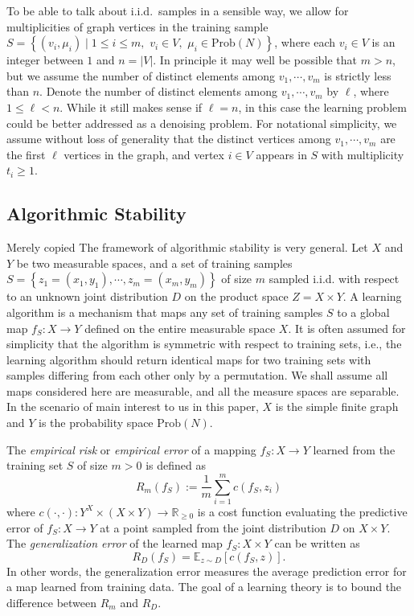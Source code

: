 \documentclass[letterpaper]{article} %
\begin{document}
To be able to talk about i.i.d.\ samples in a sensible way, we allow for multiplicities of graph vertices in the training sample $S=\left\{ \left( v_i,\mu_i \right)\mid 1\leq i\leq m,\,\,v_i\in V,\,\,\mu_i\in\mathrm{Prob}\left( N \right) \right\}$, where each $v_i\in V$ is an integer between $1$ and $n=\left| V \right|$. In principle it may well be possible that $m>n$, but we assume the number of distinct elements among $v_1,\cdots,v_m$ is strictly less than $n$. Denote the number of distinct elements among $v_1,\cdots,v_m$ by $\ell$, where $1\leq \ell<n$. While it still makes sense if $\ell=n$, in this case the learning problem could be better addressed as a denoising problem. For notational simplicity, we assume without loss of generality that the distinct vertices among $v_1,\cdots,v_m$ are the first $\ell$ vertices in the graph, and vertex $i\in V$ appears in $S$ with multiplicity $t_i\geq 1$.


\subsection{Algorithmic Stability}  {\color{red}Merely copied}
The framework of algorithmic stability \cite{DW1979,Algorithmic_Stability} is very general. Let $X$ and $Y$ be two measurable spaces, and a set of training samples $S=\left\{ z_1=\left( x_1,y_1 \right),\cdots,z_m= \left( x_m, y_m \right) \right\}$ of size $m$ sampled i.i.d. with respect to an unknown joint distribution $D$ on the product space $Z=X\times Y$. A learning algorithm is a mechanism that maps any set of training samples $S$ to a global map $f_S:X\rightarrow Y$ defined on the entire measurable space $X$. It is often assumed for simplicity that the algorithm is symmetric with respect to training sets, i.e., the learning algorithm should return identical maps for two training sets with samples differing from each other only by a permutation. We shall assume all maps considered here are measurable, and all the measure spaces are separable. In the scenario of main interest to us in this paper, $X$ is the simple finite graph and $Y$ is the probability space $\mathrm{Prob}\left( N \right)$.

The \emph{empirical risk} or \emph{empirical error} of a mapping $f_S:X\rightarrow Y$ learned from the training set $S$ of size $m>0$ is defined as
\begin{equation*}
  R_m \left( f_S \right):=\frac{1}{m}\sum_{i=1}^mc \left( f_S, z_i \right)
\end{equation*}
where $c \left( \cdot,\cdot \right):Y^X\times \left( X\times Y \right)\rightarrow\mathbb{R}_{\geq0}$ is a cost function evaluating the predictive error of $f_S:X\rightarrow Y$ at a point sampled from the joint distribution $D$ on $X\times Y$. The \emph{generalization error} of the learned map $f_S:X\times Y$ can be written as
\begin{equation*}
  R_D \left( f_S \right)=\mathbb{E}_{z\sim D} \left[ c \left( f_S,z \right) \right].
\end{equation*}
In other words, the generalization error measures the average prediction error for a map learned from  training data. The goal of a learning theory is to bound the difference between $R_m$ and $R_D$.
\end{document}
